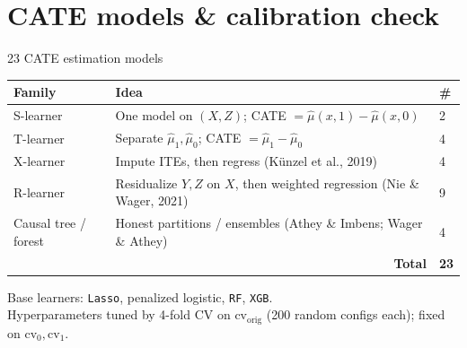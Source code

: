 \documentclass[aspectratio=169,11pt]{beamer}
\begin{document}
\section{CATE models \& calibration check}

\begin{frame}{23 CATE estimation models}
\small
\begin{tabular}{p{2.6cm} p{9.5cm} l}
\toprule
\textbf{Family} & \textbf{Idea} & \textbf{\#} \\
\midrule
S-learner & One model on $(X,Z)$; CATE $=\hat\mu(x,1)-\hat\mu(x,0)$ & 2 \\
T-learner & Separate $\hat\mu_1,\hat\mu_0$; CATE $=\hat\mu_1-\hat\mu_0$ & 4 \\
X-learner & Impute ITEs, then regress (K\"unzel et al., 2019) & 4 \\
R-learner & Residualize $Y,Z$ on $X$, then weighted regression (Nie \& Wager, 2021) & 9 \\
Causal tree / forest & Honest partitions / ensembles (Athey \& Imbens; Wager \& Athey) & 4 \\
\midrule
\multicolumn{2}{r}{\textbf{Total}} & \textbf{23} \\
\bottomrule
\end{tabular}

\vspace{0.5em}
\normalsize
Base learners: \texttt{Lasso}, penalized logistic, \texttt{RF}, \texttt{XGB}. \\
Hyperparameters tuned by 4-fold CV on $\mathrm{cv}_{\mathrm{orig}}$ (200 random configs each); fixed on $\mathrm{cv}_0,\mathrm{cv}_1$.
\end{frame}
\end{document}
